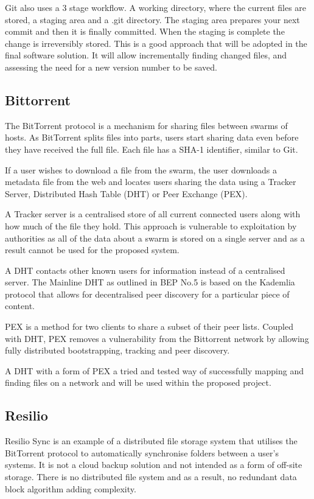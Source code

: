 \documentclass[a4paper, 11pt, twocolumn, twoside]{report}
\begin{document}
Git also uses a 3 stage workflow. A working directory, where the current files are stored, a staging area and a .git directory. The staging area prepares your next commit and then it is finally committed. When the staging is complete the change is irreversibly stored. This is a good approach that will be adopted in the final software solution. It will allow incrementally finding changed files, and assessing the need for a new version number to be saved.


\subsection{Bittorrent}
The BitTorrent protocol is a mechanism for sharing files between swarms of hosts. As BitTorrent splits files into parts, users start sharing data even before they have received the full file. Each file has a SHA-1 identifier, similar to Git. \citep{qiu2004modeling}

If a user wishes to download a file from the swarm, the user downloads a metadata file from the web and locates users sharing the data using a Tracker Server, Distributed Hash Table (DHT) or Peer Exchange (PEX). \citep{cohen2008bittorrent}

A Tracker server is a centralised store of all current connected users along with how much of the file they hold. This approach is vulnerable to exploitation by authorities as all of the data about a swarm is stored on a single server and as a result cannot be used for the proposed system.

A DHT contacts other known users for information instead of a centralised server. The Mainline DHT as outlined in BEP No.5 is based on the Kademlia protocol that allows for decentralised peer discovery for a particular piece of content.

PEX is a method for two clients to share a subset of their peer lists. Coupled with DHT, PEX removes a vulnerability from the Bittorrent network by allowing fully distributed bootstrapping, tracking and peer discovery.

A DHT with a form of PEX a tried and tested way of successfully mapping and finding files on a network and will be used within the proposed project.

\subsection{Resilio}
Resilio Sync is an example of a distributed file storage system that utilises the BitTorrent protocol to automatically synchronise folders between a user’s systems. It is not a cloud backup solution and not intended as a form of off-site storage. There is no distributed file system and as a result, no redundant data block algorithm adding complexity. \citep{farina2014bittorrent}
\end{document}
